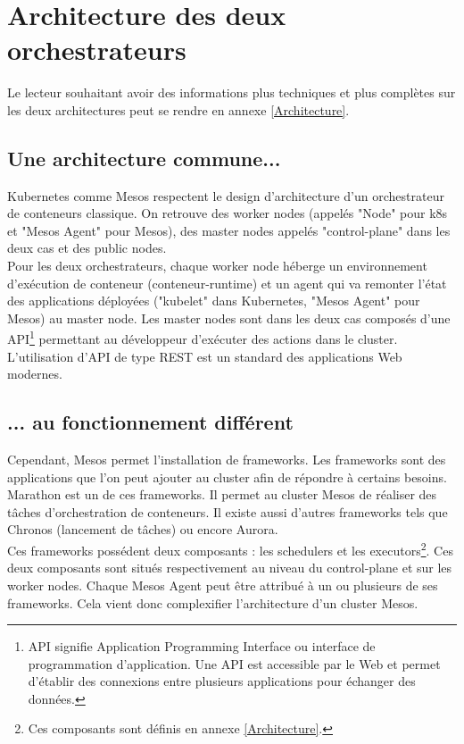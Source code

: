 \documentclass[11pt,fleqn]{book} %
\begin{document}
\section{Architecture des deux orchestrateurs}
Le lecteur souhaitant avoir des informations plus techniques et plus complètes sur les deux architectures peut se rendre en annexe \ref{Architecture}.
\subsection{Une architecture commune...}
Kubernetes comme Mesos respectent le design d'architecture d'un orchestrateur de conteneurs classique. On retrouve des worker nodes (appelés "Node" pour k8s et "Mesos Agent" pour Mesos), des master nodes appelés "control-plane" dans les deux cas et des public nodes.\\

Pour les deux orchestrateurs, chaque worker node héberge un environnement d'exécution de conteneur (conteneur-runtime) et un agent qui va remonter l'état des applications déployées ("kubelet" dans Kubernetes, "Mesos Agent" pour Mesos) au master node. Les master nodes sont dans les deux cas composés d'une API\footnote{API signifie Application Programming Interface ou interface de programmation d’application. Une API est accessible par le Web et permet d’établir des connexions entre plusieurs applications pour échanger des données.} permettant au développeur d'exécuter des actions dans le cluster. L'utilisation d'API de type REST est un standard des applications Web modernes.

\subsection{... au fonctionnement différent}
Cependant, Mesos permet l'installation de frameworks. Les frameworks sont des applications que l'on peut ajouter au cluster afin de répondre à certains besoins. Marathon est un de ces frameworks. Il permet au cluster Mesos de réaliser des tâches d'orchestration de conteneurs. Il existe aussi d'autres frameworks tels que Chronos (lancement de tâches) ou encore Aurora.\\

Ces frameworks possédent deux composants : les schedulers et les executors\footnote{Ces composants sont définis en annexe \ref{Architecture}.}. Ces deux composants sont situés respectivement au niveau du control-plane et sur les worker nodes. Chaque Mesos Agent peut être attribué à un ou plusieurs de ses frameworks. Cela vient donc complexifier l'architecture d'un cluster Mesos.\\
\end{document}
